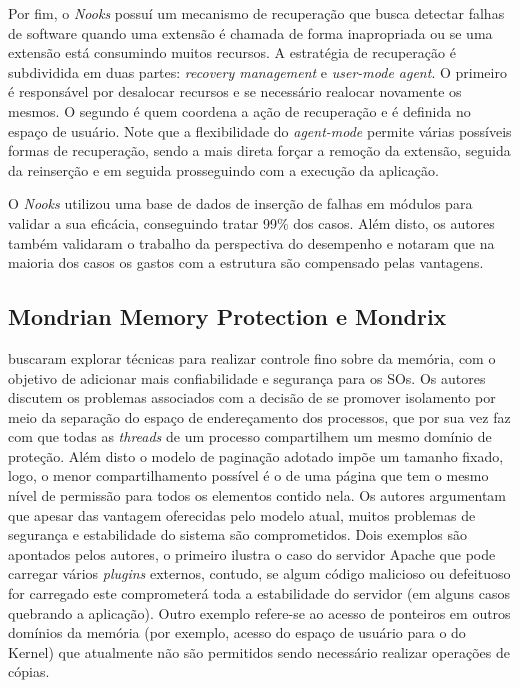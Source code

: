 Por fim, o \emph{Nooks} possuí um mecanismo de recuperação que busca detectar
falhas de software quando uma extensão é chamada de forma inapropriada ou se
uma extensão está consumindo muitos recursos. A estratégia de recuperação é
subdividida em duas partes: \emph{recovery management} e \emph{user-mode
agent}. O primeiro é responsável por desalocar recursos e se necessário
realocar novamente os mesmos. O segundo é quem coordena a ação de recuperação e
é definida no espaço de usuário. Note que a flexibilidade do \emph{agent-mode}
permite várias possíveis formas de recuperação, sendo a mais direta forçar a
remoção da extensão, seguida da reinserção e em seguida prosseguindo com a
execução da aplicação.

O \emph{Nooks} utilizou uma base de dados de inserção de falhas em módulos para
validar a sua eficácia, conseguindo tratar 99\% dos casos. Além disto, os
autores também validaram o trabalho da perspectiva do desempenho e notaram que
na maioria dos casos os gastos com a estrutura são compensado pelas vantagens.

\subsection{Mondrian Memory Protection e Mondrix}

\cite{mmp} buscaram explorar técnicas para realizar controle fino sobre da
memória, com o objetivo de adicionar mais confiabilidade e segurança para os
SOs. Os autores discutem os problemas associados com a decisão de se promover
isolamento por meio da separação do espaço de endereçamento dos processos, que
por sua vez faz com que todas as \emph{threads} de um processo compartilhem um
mesmo domínio de proteção. Além disto o modelo de paginação adotado impõe um
tamanho fixado, logo, o menor compartilhamento possível é o de uma página que
tem o mesmo nível de permissão para todos os elementos contido nela. Os autores
argumentam que apesar das vantagem oferecidas pelo modelo atual, muitos
problemas de segurança e estabilidade do sistema são comprometidos. Dois
exemplos são apontados pelos autores, o primeiro ilustra o caso do servidor
Apache que pode carregar vários \textit{plugins} externos, contudo, se algum
código malicioso ou defeituoso for carregado este comprometerá toda a
estabilidade do servidor (em alguns casos quebrando a aplicação). Outro exemplo
refere-se ao acesso de ponteiros em outros domínios da memória (por exemplo,
acesso do espaço de usuário para o do Kernel) que atualmente não são permitidos
sendo necessário realizar operações de cópias.

